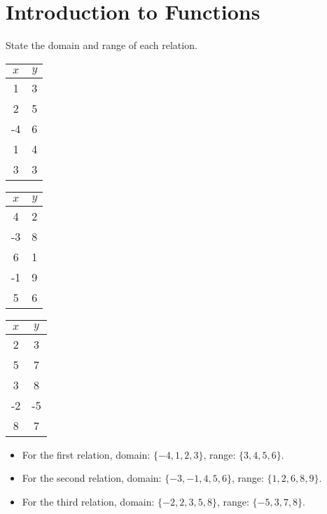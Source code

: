 \documentclass{article}
\begin{document}
\section*{Introduction to Functions}

State the domain and range of each relation.

\begin{center}
\begin{tabular}{|c|c|}
\hline
\rowcolor{gray!50}
$x$ & $y$ \\
\hline
1 & 3 \\
2 & 5 \\
-4 & 6 \\
1 & 4 \\
3 & 3 \\
\hline
\end{tabular}
\quad
\begin{tabular}{|c|c|}
\hline
\rowcolor{blue!25}
$x$ & $y$ \\
\hline
4 & 2 \\
-3 & 8 \\
6 & 1 \\
-1 & 9 \\
5 & 6 \\
\hline
\end{tabular}
\quad
\begin{tabular}{|c|c|}
\hline
\rowcolor{red!25}
$x$ & $y$ \\
\hline
2 & 3 \\
5 & 7 \\
3 & 8 \\
-2 & -5 \\
8 & 7 \\
\hline
\end{tabular}
\end{center}

\begin{itemize}
\item For the first relation, domain: $\{-4, 1, 2, 3\}$, range: $\{3, 4, 5, 6\}$.
\item For the second relation, domain: $\{-3, -1, 4, 5, 6\}$, range: $\{1, 2, 6, 8, 9\}$.
\item For the third relation, domain: $\{-2, 2, 3, 5, 8\}$, range: $\{-5, 3, 7, 8\}$.
\end{itemize}
\end{document}

